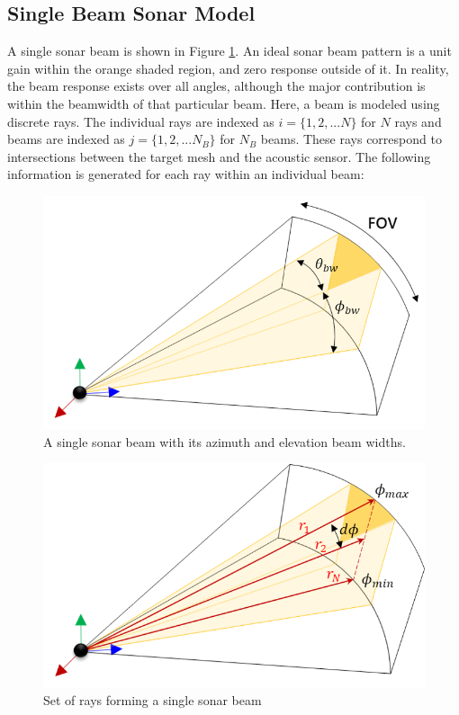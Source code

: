 \documentclass[utf8]{frontiersSCNS} %
\begin{document}
\subsection{Single Beam Sonar Model}
A single sonar beam is shown in Figure \ref{fig:single_sonar_beam}. An ideal sonar beam pattern is a unit gain within the orange shaded region, and zero response outside of it. In reality, the beam response exists over all angles, although the major contribution is within the beamwidth of that particular beam. Here, a beam is modeled using discrete rays. The individual rays are indexed as $i=\{1, 2, ... N\}$ for $N$ rays and beams are indexed as $j=\{1, 2, ... N_B\}$ for $N_B$ beams.  These rays correspond to intersections between the target mesh and the acoustic sensor. The following information is generated for each ray within an individual beam:

\begin{figure}[ht]
  \centering
  \includegraphics[width=\columnwidth]{images/single_sonar_beam.png}
  \caption{A single sonar beam with its azimuth and elevation beam widths.}
  \label{fig:single_sonar_beam}
\end{figure} 

\begin{figure}[ht]
  \centering
  \includegraphics[width=\columnwidth]{images/rays.png}
  \caption{Set of rays forming a single sonar beam}
  \label{fig:rays}
\end{figure} 
\end{document}
